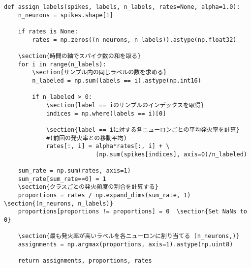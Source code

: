 \begin{verbatim}
def assign_labels(spikes, labels, n_labels, rates=None, alpha=1.0):
    n_neurons = spikes.shape[1] 
    
    if rates is None:        
        rates = np.zeros((n_neurons, n_labels)).astype(np.float32)
    
    \section{時間の軸でスパイク数の和を取る}
    for i in range(n_labels):
        \section{サンプル内の同じラベルの数を求める}
        n_labeled = np.sum(labels == i).astype(np.int16)
    
        if n_labeled > 0:
            \section{label == iのサンプルのインデックスを取得}
            indices = np.where(labels == i)[0]
            
            \section{label == iに対する各ニューロンごとの平均発火率を計算}
            #(前回の発火率との移動平均)
            rates[:, i] = alpha*rates[:, i] + \ 
                          (np.sum(spikes[indices], axis=0)/n_labeled)
    
    sum_rate = np.sum(rates, axis=1)
    sum_rate[sum_rate==0] = 1
    \section{クラスごとの発火頻度の割合を計算する}
    proportions = rates / np.expand_dims(sum_rate, 1) \section{(n_neurons, n_labels)}
    proportions[proportions != proportions] = 0  \section{Set NaNs to 0}
    
    \section{最も発火率が高いラベルを各ニューロンに割り当てる (n_neurons,)}
    assignments = np.argmax(proportions, axis=1).astype(np.uint8) 

    return assignments, proportions, rates
\end{verbatim}
